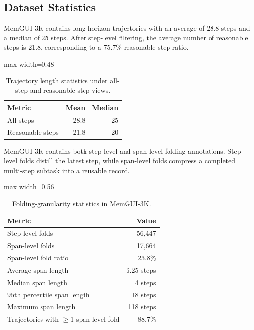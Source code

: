 \subsection{Dataset Statistics}
\label{sec:appendix-dataset-statistics}

MemGUI-3K contains long-horizon trajectories with an average of 28.8 steps and a median of 25 steps. After step-level filtering, the average number of reasonable steps is 21.8, corresponding to a 75.7\% reasonable-step ratio.

\begin{table}[h]
\centering
\footnotesize
\begin{adjustbox}{max width=0.48\linewidth}
\begin{tabular}{lrr}
\toprule
Metric & Mean & Median \\
\midrule
All steps & 28.8 & 25 \\
Reasonable steps & 21.8 & 20 \\
\bottomrule
\end{tabular}
\end{adjustbox}
\caption{Trajectory length statistics under all-step and reasonable-step views.}
\label{tab:appendix-length}
\end{table}

MemGUI-3K contains both step-level and span-level folding annotations. Step-level folds distill the latest step, while span-level folds compress a completed multi-step subtask into a reusable record.

\begin{table}[h]
\centering
\footnotesize
\begin{adjustbox}{max width=0.56\linewidth}
\begin{tabular}{lr}
\toprule
Metric & Value \\
\midrule
Step-level folds & 56{,}447 \\
Span-level folds & 17{,}664 \\
Span-level fold ratio & 23.8\% \\
Average span length & 6.25 steps \\
Median span length & 4 steps \\
95th percentile span length & 18 steps \\
Maximum span length & 118 steps \\
Trajectories with $\geq$1 span-level fold & 88.7\% \\
\bottomrule
\end{tabular}
\end{adjustbox}
\caption{Folding-granularity statistics in MemGUI-3K.}
\label{tab:appendix-folding}
\end{table}

